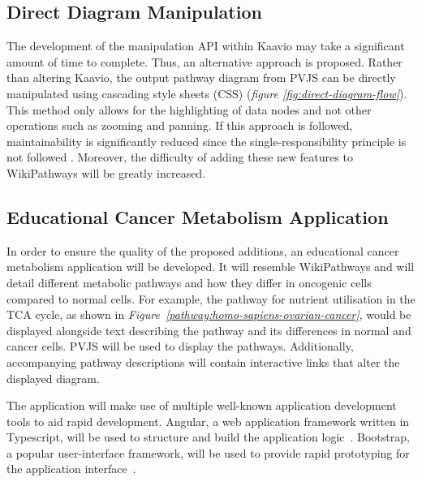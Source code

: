 \documentclass[a4paper,12pt,twoside]{apa}
\begin{document}
\subsection{Direct Diagram Manipulation}
The development of the manipulation API within Kaavio may take a significant amount of time to complete. Thus, an alternative approach is proposed. Rather than altering Kaavio, the output pathway diagram from PVJS can be directly manipulated using cascading style sheets (CSS) (\textit{figure \ref{fig:direct-diagram-flow}}). This method only allows for the highlighting of data nodes and not other operations such as zooming and panning. If this approach is followed,  maintainability is significantly reduced since the single-responsibility principle is not followed \cite{martin2003agile}. Moreover, the difficulty of adding these new features to WikiPathways will be greatly increased.

\FloatBarrier
\subsection{Educational Cancer Metabolism Application}
In order to ensure the quality of the proposed additions, an educational cancer metabolism application will be developed. It will resemble WikiPathways and will detail different metabolic pathways and how they differ in oncogenic cells compared to normal cells. For example, the pathway for nutrient utilisation in the TCA cycle, as shown in \textit{Figure~\ref{pathway:homo-sapiens-ovarian-cancer}}, would be displayed alongside text describing the pathway and its differences in normal and cancer cells.  PVJS will be used to display the pathways. Additionally, accompanying pathway descriptions will contain interactive links that alter the displayed diagram.

The application will make use of multiple well-known application development tools to aid rapid development. Angular, a web application framework written in Typescript, will be used to structure and build the application logic~\cite{Angular}. Bootstrap, a popular user-interface framework, will be used to provide rapid prototyping for the application interface~\cite{Bootstrap}.
\end{document}
